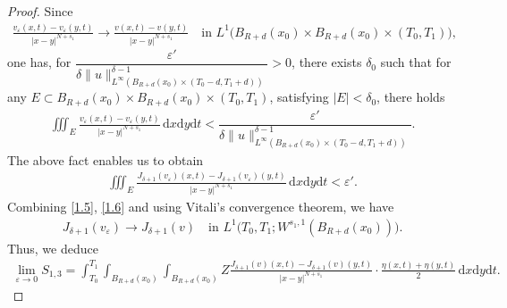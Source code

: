 \documentclass[10pt,a4paper]{amsart}
\begin{document}
\begin{proof}
	Since
	\begin{align*}
		\frac{v_{\varepsilon}(x,t)-v_{\varepsilon}(y,t)}{|x-y|^{N+s_1}}\rightarrow\frac{v(x,t)-v(y,t)}{|x-y|^{N+s_1}}\quad\text{in }L^1\bigl( B_{R+d}(x_0)\times B_{R+d}(x_0)\times (T_0,T_1)\bigl), 
	\end{align*}
	one has, for $\dfrac{\varepsilon'}{\delta\|u\|^{\delta-1}_{L^\infty\left( B_{R+d}(x_0)\times(T_0-d,T_1+d)\right)}}>0$, there exists $\delta_0$ such that for any $E\subset B_{R+d}(x_0)\times B_{R+d}(x_0)\times(T_0,T_1)$, satisfying $|E|<\delta_0$, there holds
	\begin{align*}
		\iiint_E\frac{v_{\varepsilon}(x,t)-v_{\varepsilon}(y,t)}{|x-y|^{N+s_1}}\,\mathrm{d}x\mathrm{d}y\mathrm{d}t<\dfrac{\varepsilon'}{\delta\|u\|^{\delta-1}_{L^\infty\left( B_{R+d}(x_0)\times(T_0-d,T_1+d)\right)}}.
	\end{align*}
	The above fact enables us to obtain
	\begin{align}
		\label{1.6}
		\iiint_E\frac{J_{\delta+1}(v_\varepsilon)(x,t)-J_{\delta+1}(v_\varepsilon)(y,t)}{|x-y|^{N+s_1}}\,\mathrm{d}x\mathrm{d}y\mathrm{d}t<\varepsilon'.
	\end{align}
	Combining \eqref{1.5}, \eqref{1.6} and using Vitali's convergence theorem, we have
	\begin{align*}
		J_{\delta+1}(v_\varepsilon)\rightarrow J_{\delta+1}(v)\quad\text{in }L^1\bigl(T_0,T_1;W^{s_1,1}(B_{R+d}(x_0))\bigl).
	\end{align*}
	Thus, we deduce
	\begin{align*}
		\lim\limits_{\varepsilon\rightarrow0}S_{1,3}=\int_{T_0}^{T_1}\int_{B_{R+d}(x_0)}\int_{B_{R+d}(x_0)}Z\frac{J_{\delta+1}(v)(x,t)-J_{\delta+1}(v)(y,t)}{|x-y|^{N+s_1}}\cdot\frac{\eta(x,t)+\eta(y,t)}{2}\,\mathrm{d}x\mathrm{d}y\mathrm{d}t.
	\end{align*}
	

\end{proof}
\end{document}
